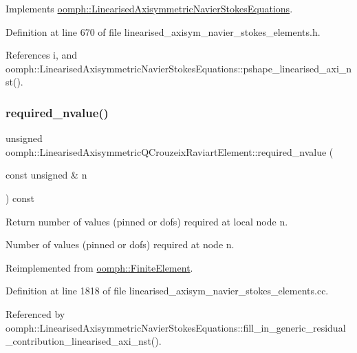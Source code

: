 Implements \hyperlink{classoomph_1_1LinearisedAxisymmetricNavierStokesEquations_ae2f6cf4a374c45a35ac1bea04ffced1f}{oomph\+::\+Linearised\+Axisymmetric\+Navier\+Stokes\+Equations}.



Definition at line 670 of file linearised\+\_\+axisym\+\_\+navier\+\_\+stokes\+\_\+elements.\+h.



References i, and oomph\+::\+Linearised\+Axisymmetric\+Navier\+Stokes\+Equations\+::pshape\+\_\+linearised\+\_\+axi\+\_\+nst().

\mbox{\label{classoomph_1_1LinearisedAxisymmetricQCrouzeixRaviartElement_a98093f738bed5e37fd68a3c2e841963d}} 
\subsubsection{\texorpdfstring{required\+\_\+nvalue()}{required\_nvalue()}}
{\footnotesize\ttfamily unsigned oomph\+::\+Linearised\+Axisymmetric\+Q\+Crouzeix\+Raviart\+Element\+::required\+\_\+nvalue (\begin{DoxyParamCaption}\item[{const unsigned \&}]{n }\end{DoxyParamCaption}) const\hspace{0.3cm}{\ttfamily [virtual]}}



Return number of values (pinned or dofs) required at local node n. 

Number of values (pinned or dofs) required at node n. 

Reimplemented from \hyperlink{classoomph_1_1FiniteElement_a56610c60d5bc2d7c27407a1455471b1a}{oomph\+::\+Finite\+Element}.



Definition at line 1818 of file linearised\+\_\+axisym\+\_\+navier\+\_\+stokes\+\_\+elements.\+cc.



Referenced by oomph\+::\+Linearised\+Axisymmetric\+Navier\+Stokes\+Equations\+::fill\+\_\+in\+\_\+generic\+\_\+residual\+\_\+contribution\+\_\+linearised\+\_\+axi\+\_\+nst().



